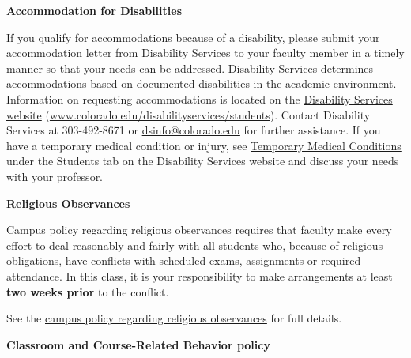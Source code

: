 \documentclass[11pt]{article}
\begin{document}

\newpage
\normalsize

\textbf{\normalsize Accommodation for Disabilities}


If you qualify for accommodations because of a disability, please submit your accommodation letter from Disability Services to your faculty member in a timely manner so that your needs can be addressed. Disability Services determines accommodations based on documented disabilities in the academic environment. Information on requesting accommodations is located on the \href{http://www.colorado.edu/disabilityservices/students}{Disability Services website} (\url{www.colorado.edu/disabilityservices/students}). Contact Disability Services at 303-492-8671 or \href{mailto:dsinfo@colorado.edu}{dsinfo@colorado.edu} for further assistance. If you have a temporary medical condition or injury, see \href{http://www.colorado.edu/disabilityservices/students/temporary-medical-conditions}{Temporary Medical Conditions} under the Students tab on the Disability Services website and discuss your needs with your professor.

\bigskip

\textbf{\normalsize Religious Observances}



Campus policy regarding religious observances requires that faculty make every effort to deal reasonably and fairly with all students who, because of religious obligations, have conflicts with scheduled exams, assignments or required attendance. In this class, it is your responsibility to make arrangements at least \textbf{two weeks prior} to the conflict.

See the \href{http://www.colorado.edu/policies/observance-religious-holidays-and-absences-classes-andor-exams}{campus policy regarding religious observances} for full details.


\bigskip

\textbf{\normalsize Classroom and Course-Related Behavior policy}
\end{document}
